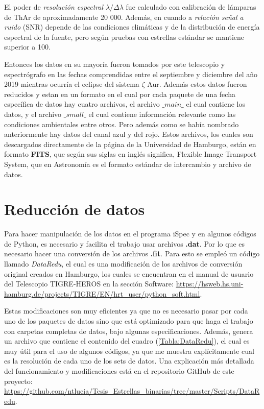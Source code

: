 \documentclass[12pt,oneside,openany,letter]{book}
\begin{document}
\noindent El poder de \textit{resolución espectral} $\lambda / \Delta \lambda$ fue calculado con calibración de lámparas de ThAr de aproximadamente 20 000. Además, en cuando a \textit{relación señal a ruido} (SNR) depende de las condiciones climáticas y de la distribución de energía espectral de la fuente, pero según pruebas con estrellas estándar se mantiene superior a 100. 

\noindent Entonces los datos en su mayoría fueron tomados por este telescopio y espectrógrafo en las fechas comprendidas entre el septiembre y diciembre del año 2019 mientras ocurría el eclipse del sistema $\zeta$ Aur. Además estos datos fueron reducidos y estan en un formato en el cual por cada paquete de una fecha específica de datos hay cuatro archivos, el archivo $\_ main\_$ el cual contiene los datos, y el archivo $\_ small\_$ el cual contiene información relevante como las condiciones ambientales entre otros. Pero además como se había nombrado anteriormente hay datos del canal azul y del rojo. Estos archivos, los cuales son descargados directamente de la página de la Universidad de Hamburgo, están en formato \textbf{FITS}, que según sus siglas en inglés significa, Flexible Image Transport System, que en Astronomía es el formato estándar \citep{hanisch2001definition} de intercambio y archivo de datos.

\section{Reducción de datos}

Para hacer manipulación de los datos en el programa iSpec y en algunos códigos de Python, es necesario y facilita el trabajo usar archivos \textbf{.dat}. Por lo que es necesario hacer una conversión de los archivos \textbf{.fit}. Para esto se empleó un código llamado \textit{DataRedu}, el cual es una modificación de los archivos de conversión original creados en Hamburgo, los cuales se encuentran en el manual de usuario del Telescopio TIGRE-HEROS en la sección Software: \url{https://hsweb.hs.uni-hamburg.de/projects/TIGRE/EN/hrt_user/python_soft.html}. 

\noindent Estas modificaciones son muy eficientes ya que no es necesario pasar por cada uno de los paquetes de datos sino que está optimizado para que haga el trabajo con carpetas completas de datos, bajo algunas especificaciones. Además, genera un archivo que contiene el contenido del cuadro (\ref{Tabla:DataRedu}), el cual es muy útil para el uso de algunos códigos, ya que me muestra explícitamente cual es la resolución de cada uno de los sets de datos. Una explicación más detallada del funcionamiento y modificaciones está en el repositorio GitHub de este proyecto: \url{https://github.com/ntlucia/Tesis_Estrellas_binarias/tree/master/Scripts/DataRedu}.
\end{document}
